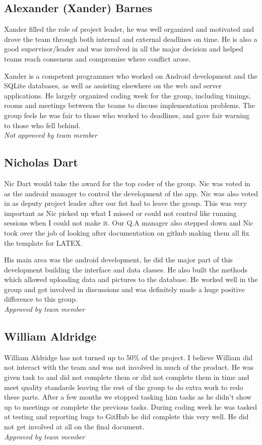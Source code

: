 \subsection{Alexander (Xander) Barnes}
    Xander filled the role of project leader, he was well organized and motivated and drove the team through both internal and external deadlines on time. He is also a good supervisor/leader and was involved in all the major decision and helped teams reach consensus and compromise where conflict arose.

    Xander is a competent programmer who worked on Android development and the SQLite databases, as well as assisting elsewhere on the web and server applications. He largely organized coding week for the group, including timings, rooms and meetings between the teams to discuss implementation problems. The group feels he was fair to those who worked to deadlines, and gave fair warning to those who fell behind.\\
    \emph{Not approved by team member}

\subsection{Nicholas Dart}
    Nic Dart would take the award for the top coder of the group. Nic was voted in as the android manager to control the development of the app. Nic was also voted in as deputy project leader after our fist had to leave the group. This was very important as Nic picked up what I missed or could not control like running sessions when I could not make it. Our Q.A manager also stepped down and Nic took over the job of looking after documentation on github making them all fix the template for LATEX.

    His main area was the android development, he did the major part of this development building the interface and data classes. He also built the methods which allowed uploading data and pictures to the database. He worked well in the group and got involved in discussions and was definitely made a huge positive difference to this group.\\
    \emph{Approved by team member}
    
\subsection{William Aldridge}
    William Aldridge has not turned up to 50\% of the project. I believe William did not interact with the team and was not involved in much of the product. He was given task to and did not complete them or did not complete them in time and meet quality standards leaving the rest of the group to do extra work to redo these parts. After a few months we stopped tasking him tasks as he didn't show up to meetings or complete the previous tasks. During coding week he was tasked at testing and reporting bugs to GitHub he did complete this very well. He did not get involved at all on the final document.\\
    \emph{Approved by team member}

